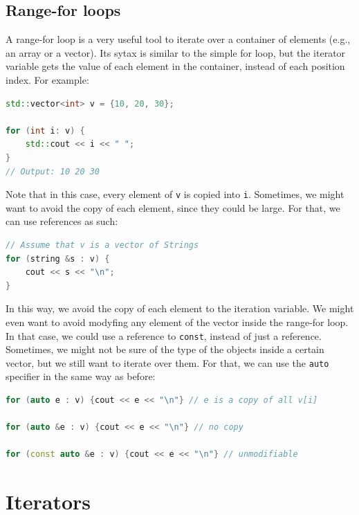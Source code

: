 \subsection{Range-for loops}

A range-for loop is a very useful tool to iterate over a container of elements (e.g.,
an array or a vector). Its sytax is similar to the simple for loop, but the iterator
variable gets the value of each element in the container, instead of each position
index. For example:\\

\begin{lstlisting}[language=C++]
std::vector<int> v = {10, 20, 30};

for (int i: v) {
    std::cout << i << " ";
}
// Output: 10 20 30
\end{lstlisting}

Note that in this case, every element of \texttt{v} is copied into \texttt{i}.
Sometimes, we might want to avoid the copy of each element, since they could
be large. For that, we can use references as such:\\

\begin{lstlisting}[language=C++]
// Assume that v is a vector of Strings
for (string &s : v) {
    cout << s << "\n";
}
\end{lstlisting}

In this way, we avoid the copy of each element to the iteration variable. We might even
want to avoid modyfing any element of the vector inside the range-for loop. In that
case, we could use a reference to \texttt{const}, instead of just a reference.\\

Sometimes, we might not be sure of the type of the objects inside a certain vector,
but we still want to iterate over them. For that, we can use the \texttt{auto} specifier
in the same way as before:\\

\begin{lstlisting}[language=C++]
for (auto e : v) {cout << e << "\n"} // e is a copy of all v[i]

for (auto &e : v) {cout << e << "\n"} // no copy

for (const auto &e : v) {cout << e << "\n"} // unmodifiable
\end{lstlisting}

\section{Iterators}

